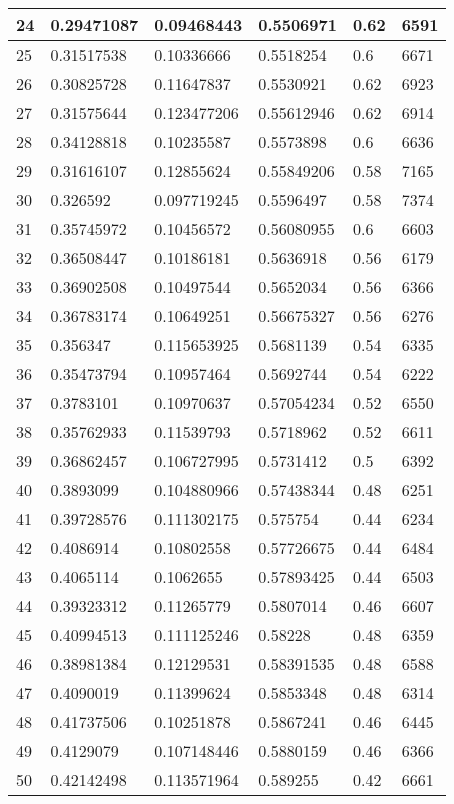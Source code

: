 \begin{longtable}{|l|l|l|l|l|l|}
24 & 0.29471087 & 0.09468443 & 0.5506971 & 0.62 & 6591 \\ \hline 
25 & 0.31517538 & 0.10336666 & 0.5518254 & 0.6 & 6671 \\ \hline 
26 & 0.30825728 & 0.11647837 & 0.5530921 & 0.62 & 6923 \\ \hline 
27 & 0.31575644 & 0.123477206 & 0.55612946 & 0.62 & 6914 \\ \hline 
28 & 0.34128818 & 0.10235587 & 0.5573898 & 0.6 & 6636 \\ \hline 
29 & 0.31616107 & 0.12855624 & 0.55849206 & 0.58 & 7165 \\ \hline 
30 & 0.326592 & 0.097719245 & 0.5596497 & 0.58 & 7374 \\ \hline 
31 & 0.35745972 & 0.10456572 & 0.56080955 & 0.6 & 6603 \\ \hline 
32 & 0.36508447 & 0.10186181 & 0.5636918 & 0.56 & 6179 \\ \hline 
33 & 0.36902508 & 0.10497544 & 0.5652034 & 0.56 & 6366 \\ \hline 
34 & 0.36783174 & 0.10649251 & 0.56675327 & 0.56 & 6276 \\ \hline 
35 & 0.356347 & 0.115653925 & 0.5681139 & 0.54 & 6335 \\ \hline 
36 & 0.35473794 & 0.10957464 & 0.5692744 & 0.54 & 6222 \\ \hline 
37 & 0.3783101 & 0.10970637 & 0.57054234 & 0.52 & 6550 \\ \hline 
38 & 0.35762933 & 0.11539793 & 0.5718962 & 0.52 & 6611 \\ \hline 
39 & 0.36862457 & 0.106727995 & 0.5731412 & 0.5 & 6392 \\ \hline 
40 & 0.3893099 & 0.104880966 & 0.57438344 & 0.48 & 6251 \\ \hline 
41 & 0.39728576 & 0.111302175 & 0.575754 & 0.44 & 6234 \\ \hline 
42 & 0.4086914 & 0.10802558 & 0.57726675 & 0.44 & 6484 \\ \hline 
43 & 0.4065114 & 0.1062655 & 0.57893425 & 0.44 & 6503 \\ \hline 
44 & 0.39323312 & 0.11265779 & 0.5807014 & 0.46 & 6607 \\ \hline 
45 & 0.40994513 & 0.111125246 & 0.58228 & 0.48 & 6359 \\ \hline 
46 & 0.38981384 & 0.12129531 & 0.58391535 & 0.48 & 6588 \\ \hline 
47 & 0.4090019 & 0.11399624 & 0.5853348 & 0.48 & 6314 \\ \hline 
48 & 0.41737506 & 0.10251878 & 0.5867241 & 0.46 & 6445 \\ \hline 
49 & 0.4129079 & 0.107148446 & 0.5880159 & 0.46 & 6366 \\ \hline 
50 & 0.42142498 & 0.113571964 & 0.589255 & 0.42 & 6661 \\ \hline 
\end{longtable}